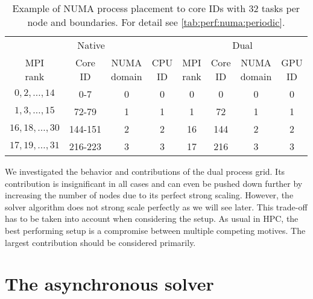 \begin{table}[h]
\centering
\begin{tabular}{cccccccc}
\multicolumn{4}{c}{Native} & \multicolumn{4}{c}{Dual} \\
\cmidrule(lr){1-4}
\cmidrule(lr){5-8} 
\makecell{MPI\\rank} &
\makecell{Core\\ID} &
\makecell{NUMA\\domain} &
\makecell{CPU\\ID} &
\makecell{MPI\\rank} &
\makecell{Core\\ID} &
\makecell{NUMA\\domain} &
\makecell{GPU\\ID} \\
\cmidrule(lr){1-4}
\cmidrule(lr){5-8} 
$0,2, \ldots, 14$   & 0-7     & 0 & 0 & 0  & 0   & 0 & 0 \\
$1,3, \ldots , 15$  & 72-79   & 1 & 1 & 1  & 72  & 1 & 1 \\
$16,18, \ldots, 30$ & 144-151 & 2 & 2 & 16 & 144 & 2 & 2 \\
$17,19, \ldots, 31$ & 216-223 & 3 & 3 & 17 & 216 & 3 & 3 \\
\end{tabular}
\caption{Example of NUMA process placement to core IDs with \num{32} tasks per node and \Cstar boundaries. For detail see \cref{tab:perf:numa:periodic}.}
\label{tab:perf:numa:cstar}
\end{table}

We investigated the behavior and contributions of the dual process grid.
Its contribution is insignificant in all cases and can even be pushed down further by increasing the number of nodes due to its perfect strong scaling.
However, the solver algorithm does not strong scale perfectly as we will see later.
This trade-off has to be taken into account when considering the setup.
As usual in HPC, the best performing setup is a compromise between multiple competing motives.
The largest contribution should be considered primarily.

\section{The asynchronous solver}
\label{sec:perf:solver:async}


